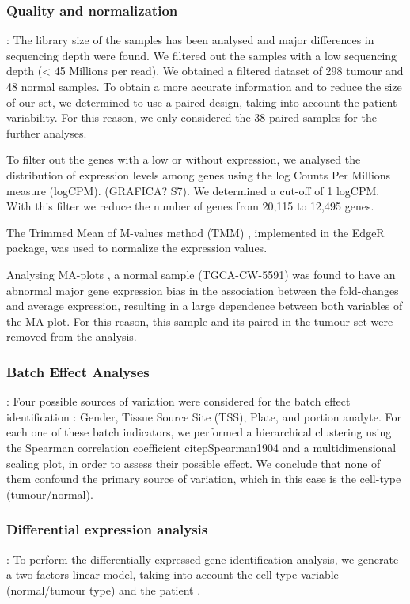 \documentclass[9pt,twocolumn,twoside]{gsajnl}
\begin{document}
\subsubsection*{Quality and normalization }
: The library size of the samples has been analysed and major differences in sequencing depth were found. We filtered out the samples with a low sequencing depth (< 45 Millions per read). We obtained a filtered dataset of 298 tumour and 48 normal samples. To obtain a more accurate information and to reduce the size of our set, we determined to use a paired design, taking into account the patient variability. For this reason, we only considered the 38 paired samples for the further analyses.

To filter out the genes with a low or without expression, we analysed the distribution of expression levels among genes using the log Counts Per Millions measure (logCPM). (GRAFICA? S7). We determined a cut-off of 1 logCPM. With this filter we reduce the number of genes from 20,115 to 12,495 genes.

The Trimmed Mean of M-values method (TMM) \citep{Robinson2010}, implemented in the EdgeR package, was used to normalize the expression values.

Analysing MA-plots \citep{Dudoit2002}, a normal sample (TGCA-CW-5591) was found to have an abnormal major gene expression bias in the association between the fold-changes and average expression, resulting in a large dependence between both variables of the MA plot. For this reason, this sample and its paired in the tumour set were removed from the analysis.


\subsubsection*{Batch Effect Analyses}
: Four possible sources of variation were considered for the batch effect identification \citep{Leek2010}: Gender, Tissue Source Site (TSS), Plate, and portion analyte. For each one of these batch indicators, we performed a hierarchical clustering using the Spearman correlation coefficient citep{Spearman1904}  and a multidimensional scaling plot, in order to assess their possible effect. We conclude that none of them confound the primary source of variation, which in this case is the cell-type (tumour/normal).

\subsubsection*{Differential expression analysis	}
: To perform the differentially expressed gene identification analysis, we generate a two factors linear model, taking into account the cell-type variable (normal/tumour type) and the patient \citep{Smyth2004}.
\end{document}
